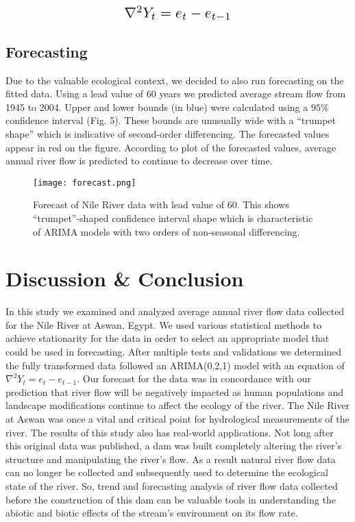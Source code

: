 \documentclass{article}
\begin{document}
\[ \scalebox{1.5} {$\nabla^2Y_{t} = e_{t} - e_{t-1}$} \]

\subsection{Forecasting}
Due to the valuable ecological context, we decided to also run forecasting on the fitted data. Using a lead value of 60 years we predicted average stream flow from 1945 to 2004. Upper and lower bounds (in blue) were calculated using a $95\%$ confidence interval (Fig. 5). These bounds are unusually wide with a “trumpet shape” which is indicative of second-order differencing\cite{nau}. The forecasted values appear in red on the figure. According to plot of the forecasted values, average annual river flow is predicted to continue to decrease over time. 
\begin{figure}[H]
\begin{center}
\texttt{[image: forecast.png]}
\caption{Forecast of Nile River data with lead value of 60. This shows “trumpet”-shaped confidence interval shape which is characteristic of ARIMA models with two orders of non-seasonal differencing.}
\end{center}
\end{figure}


\section{Discussion \& Conclusion}
In this study we examined and analyzed average annual river flow data collected for the Nile River at Aswan, Egypt. We used various statistical methods to achieve stationarity for the data in order to select an appropriate model that could be used in forecasting. After multiple tests and validations we determined the fully transformed data followed an ARIMA(0,2,1) model with an equation of $\nabla^2Y_{t} = e_{t} - e_{t-1}$. Our forecast for the data was in concordance with our prediction that river flow will be negatively impacted as human populations and landscape modifications continue to affect the ecology of the river. The Nile River at Aswan was once a vital and critical point for hydrological measurements of the river. The results of this study also has real-world applications. Not long after this original data was published\cite{hipelmcleod}, a dam was built completely altering the river's structure and manipulating the river's flow. As a result natural river flow data can no longer be collected and subsequently used to determine the ecological state of the river. So, trend and forecasting analysis of river flow data collected before the construction of this dam can be valuable tools in understanding the abiotic and biotic effects of the stream's environment on its flow rate. 
\end{document}
